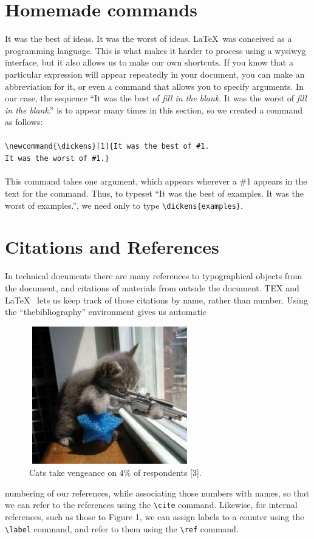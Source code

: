 \documentclass[12pt,A4]{article}
\begin{document}
	\section{Homemade commands}
	It was the best of ideas. It was the worst of ideas. \LaTeX \ was conceived as
	a programming language. This is what makes it harder to process using a
	wysiwyg interface, but it also allows us to make our own shortcuts. If you
	know that a particular expression will appear repeatedly in your document,
	you can make an abbreviation for it, or even a command that allows you to
	specify arguments. In our case, the sequence “It was the best of \textit{fill in the
	blank}. It was the worst of \textit{fill in the blank}.” is to appear many times in this
	section, so we created a command as follows:\\ \\
	\verb|\newcommand{\dickens}[1]{It was the best of #1.|
	\\
	\verb|It was the worst of #1.}| \\ \\
	This command takes one argument, which appears wherever a \#1 appears
	in the text for the command. Thus, to typeset “It was the best of examples.
	It was the worst of examples.”, we need only to type \verb|\dickens{examples}|.
	
	\section{Citations and References}
	In technical documents there are many references to typographical objects
	from the document, and citations of materials from outside the document.
	TEX \cite{p1} and \LaTeX \ \cite{p2} lets us keep track of those citations by name, rather
	than number. Using the “thebibliography” environment gives us automatic
	\begin{figure}[t]
		\includegraphics[height=6cm, width=7cm]{spiner.jpg}
		\caption{Cats take vengeance on 4\% of respondents [3].}
	\end{figure}
	numbering of our references, while associating those numbers with names,
	so that we can refer to the references using the \verb|\cite| command. Likewise,
	for internal references, such as those to Figure 1, we can assign labels to
	a counter using the \verb|\label| command, and refer to them using the \verb|\ref|
	command.
	
\end{document}

